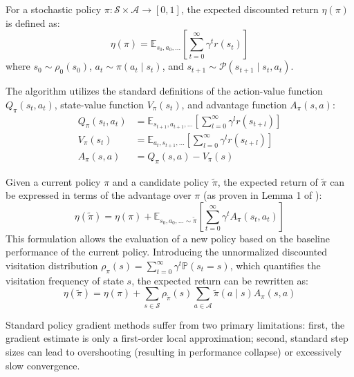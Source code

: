\documentclass[a4paper]{scrartcl}
\begin{document}
For a stochastic policy $\pi : \mathcal{S} \times \mathcal{A} \rightarrow [0,1]$, the expected discounted return $\eta(\pi)$ is defined as:
\begin{equation}
    \eta(\pi) = \mathbb{E}_{s_0, a_0, \dots} \left[ \sum_{t=0}^{\infty} \gamma^t r(s_t) \right]
\end{equation}
where $s_0 \sim \rho_0(s_0)$, $a_t \sim \pi(a_t \mid s_t)$, and $s_{t+1} \sim \mathcal{P}(s_{t+1} \mid s_t, a_t)$.

The algorithm utilizes the standard definitions of the action-value function $Q_\pi(s_t, a_t)$, state-value function $V_\pi(s_t)$, and advantage function $A_\pi(s, a)$:
\begin{equation}
\begin{aligned}
    Q_\pi(s_t, a_t) &= \mathbb{E}_{s_{t+1}, a_{t+1}, \dots} \left[ \sum_{l=0}^{\infty} \gamma^l r(s_{t+l}) \right] \\
    V_\pi(s_t) &= \mathbb{E}_{a_t, s_{t+1}, \dots} \left[ \sum_{l=0}^{\infty} \gamma^l r(s_{t+l}) \right] \\
    A_\pi(s, a) &= Q_\pi(s, a) - V_\pi(s)
\end{aligned}
\end{equation}

Given a current policy $\pi$ and a candidate policy $\tilde{\pi}$, the expected return of $\tilde{\pi}$ can be expressed in terms of the advantage over $\pi$ (as proven in Lemma 1 of \cite{DBLP:conf/icml/SchulmanLAPM15}):
\begin{equation}
    \eta(\tilde{\pi}) = \eta(\pi) + \mathbb{E}_{s_0, a_0, \dots \sim \tilde{\pi}} \left[ \sum_{t=0}^{\infty} \gamma^t A_\pi(s_t, a_t) \right]
\end{equation}
This formulation allows the evaluation of a new policy based on the baseline performance of the current policy. Introducing the unnormalized discounted visitation distribution $\rho_\pi(s) = \sum_{t=0}^{\infty} \gamma^t \mathbb{P}(s_t = s)$, which quantifies the visitation frequency of state $s$, the expected return can be rewritten as:
\begin{equation}
    \eta(\tilde{\pi}) = \eta(\pi) + \sum_{s \in \mathcal{S}} \rho_{\tilde{\pi}}(s) \sum_{a \in \mathcal{A}} \tilde{\pi}(a \mid s) A_\pi(s,a)
\end{equation}

Standard policy gradient methods suffer from two primary limitations: first, the gradient estimate is only a first-order local approximation; second, standard step sizes can lead to overshooting (resulting in performance collapse) or excessively slow convergence. 
\end{document}
